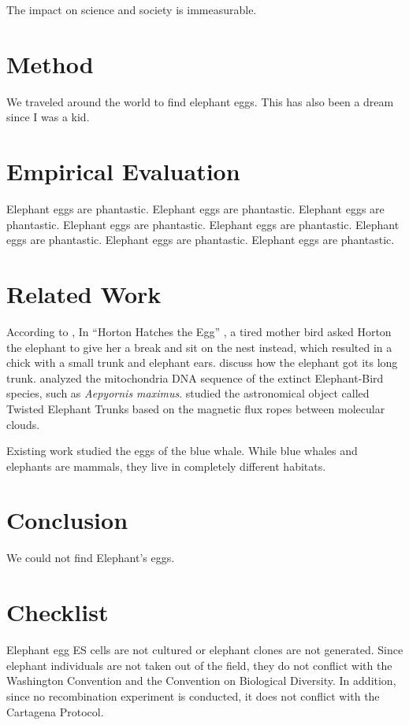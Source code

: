 The impact on science and society is immeasurable.

\section{Method}

We traveled around the world to find elephant eggs. This has also been a dream since I was a kid.

\section{Empirical Evaluation}

Elephant eggs are phantastic.
Elephant eggs are phantastic.
Elephant eggs are phantastic.
Elephant eggs are phantastic.
Elephant eggs are phantastic.
Elephant eggs are phantastic.
Elephant eggs are phantastic.
Elephant eggs are phantastic.

\section{Related Work}

According to \citet{folbre1997future},
In ``Horton Hatches the Egg'' \cite{seuss1968horton},
a tired mother bird asked Horton the elephant to give her a break and
sit on the nest instead, which resulted in a chick with a small trunk and
elephant ears.
\citet{kipling1983elephant} discuss how the elephant got its long trunk.
\citet{cooper2001complete} analyzed the mitochondria DNA sequence of the extinct Elephant-Bird species,
such as \emph{Aepyornis maximus}.
\citet{carlqvist2003theory} studied the astronomical object called Twisted Elephant Trunks
based on the magnetic flux ropes between molecular clouds.

Existing work studied the eggs of the blue whale.
While blue whales and elephants are mammals, they live in completely different habitats.

\section{Conclusion}

We could not find Elephant's eggs.

\section*{Checklist}

Elephant egg ES cells are not cultured or elephant clones are not
generated. Since elephant individuals are not taken out of the field,
they do not conflict with the Washington Convention and the Convention
on Biological Diversity. In addition, since no recombination experiment
is conducted, it does not conflict with the Cartagena Protocol.

